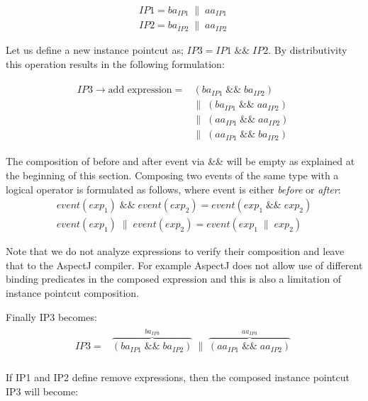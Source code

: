 \documentclass{acm_proc_article-sp}
\begin{document}
\begin{align}
	IP1 = ba_{IP1}\;\|\;aa_{IP1}\;%
\label{i1}	\\
	IP2 = ba_{IP2}\;\|\;aa_{IP2}\;%
\label{i2}
\end{align}

Let us define a new instance pointcut as; $IP3 = IP1\;\textrm{\&\&}\;IP2$. By distributivity this operation results in the following formulation:

\begin{align}
\begin{split}
IP3 \rightarrow \textrm{add expression} =& \left( ba_{IP1}\;\textrm{\&\&}\;ba_{IP2}\right)\;\\ 
							&\|\;\left( ba_{IP1}\;\textrm{\&\&}\;aa_{IP2} \right)\;\\
&\|\;\left( aa_{IP1}\;\textrm{\&\&}\;aa_{IP2} \right)\;\\
&\|\;\left( aa_{IP1}\;\textrm{\&\&}\;ba_{IP2} \right) 
\label{i3add}
\end{split}
\end{align}

The composition of before and after event via \&\& will be empty as explained at the beginning of this section. Composing two events of the same type with a logical operator is formulated as follows, where event is either \emph{before} or \emph{after}:
\begin{align*}
event(exp_1)\;\&\&\;event(exp_2) = event(exp_1\;\&\&\;exp_2) \\
event(exp_1)\;\|\;event(exp_2) = event(exp_1\;\|\;exp_2)
\end{align*}

Note that we do not analyze expressions to verify their composition and leave that to the AspectJ compiler. For example AspectJ does not allow use of different binding predicates in the composed expression and this is also a limitation of instance pointcut composition. 

Finally IP3 becomes:
\begin{align}
\begin{split}
IP3 =& \overbrace{\left( ba_{IP1}\;\textrm{\&\&}\;ba_{IP2}\right)}^{ba_{IP3}}\;\|\;\overbrace{\left( aa_{IP1}\;\textrm{\&\&}\;aa_{IP2} \right)}^{aa_{IP3}}\;\\
\label{ip3step}
\end{split}
\end{align}

If IP1 and IP2 define remove expressions, then the composed instance pointcut IP3 will become:
\end{document}
